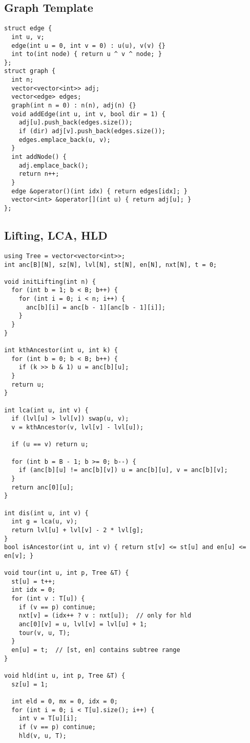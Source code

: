 \documentclass[FSZ,a4paper,onesided]{article}
\begin{document}
\begin{multicols*}{\COLS}
\subsection{Graph Template}
\begin{lstlisting}
struct edge {
  int u, v;
  edge(int u = 0, int v = 0) : u(u), v(v) {}
  int to(int node) { return u ^ v ^ node; }
};
struct graph {
  int n;
  vector<vector<int>> adj;
  vector<edge> edges;
  graph(int n = 0) : n(n), adj(n) {}
  void addEdge(int u, int v, bool dir = 1) {
    adj[u].push_back(edges.size());
    if (dir) adj[v].push_back(edges.size());
    edges.emplace_back(u, v);
  }
  int addNode() {
    adj.emplace_back();
    return n++;
  }
  edge &operator()(int idx) { return edges[idx]; }
  vector<int> &operator[](int u) { return adj[u]; }
};
\end{lstlisting}
\subsection{Lifting, LCA, HLD}
\begin{lstlisting}
using Tree = vector<vector<int>>;
int anc[B][N], sz[N], lvl[N], st[N], en[N], nxt[N], t = 0;

void initLifting(int n) {
  for (int b = 1; b < B; b++) {
    for (int i = 0; i < n; i++) {
      anc[b][i] = anc[b - 1][anc[b - 1][i]];
    }
  }
}

int kthAncestor(int u, int k) {
  for (int b = 0; b < B; b++) {
    if (k >> b & 1) u = anc[b][u];
  }
  return u;
}

int lca(int u, int v) {
  if (lvl[u] > lvl[v]) swap(u, v);
  v = kthAncestor(v, lvl[v] - lvl[u]);

  if (u == v) return u;

  for (int b = B - 1; b >= 0; b--) {
    if (anc[b][u] != anc[b][v]) u = anc[b][u], v = anc[b][v];
  }
  return anc[0][u];
}

int dis(int u, int v) {
  int g = lca(u, v);
  return lvl[u] + lvl[v] - 2 * lvl[g];
}
bool isAncestor(int u, int v) { return st[v] <= st[u] and en[u] <= en[v]; }

void tour(int u, int p, Tree &T) {
  st[u] = t++;
  int idx = 0;
  for (int v : T[u]) {
    if (v == p) continue;
    nxt[v] = (idx++ ? v : nxt[u]);  // only for hld
    anc[0][v] = u, lvl[v] = lvl[u] + 1;
    tour(v, u, T);
  }
  en[u] = t;  // [st, en] contains subtree range
}

void hld(int u, int p, Tree &T) {
  sz[u] = 1;

  int eld = 0, mx = 0, idx = 0;
  for (int i = 0; i < T[u].size(); i++) {
    int v = T[u][i];
    if (v == p) continue;
    hld(v, u, T);


\end{lstlisting}
\end{multicols*}
\end{document}
